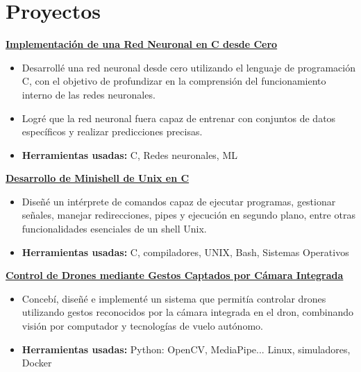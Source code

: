 \documentclass[letterpaper]{twentysecondcv} %
\begin{document}
\section{Proyectos}
\textbf{\underline{Implementación de una Red Neuronal en C desde Cero}}
{\begin{itemize}
        \item Desarrollé una red neuronal desde cero utilizando el lenguaje de programación C, con el objetivo de profundizar en la comprensión del funcionamiento interno de las redes neuronales.
        \item Logré que la red neuronal fuera capaz de entrenar con conjuntos de datos específicos y realizar predicciones precisas.
        \item \textbf{Herramientas usadas:} C, Redes neuronales, ML
\end{itemize}}
\textbf{\underline{Desarrollo de Minishell de Unix en C}}
{\begin{itemize}
        \item Diseñé un intérprete de comandos capaz de ejecutar programas, gestionar señales, manejar redirecciones, pipes y ejecución en segundo plano, entre otras funcionalidades esenciales de un shell Unix.
        \item \textbf{Herramientas usadas:} C, compiladores, UNIX, Bash, Sistemas Operativos
\end{itemize}}
\textbf{\underline{Control de Drones mediante Gestos Captados por Cámara Integrada}}
{\begin{itemize}
        \item Concebí, diseñé e implementé un sistema que permitía controlar drones utilizando gestos reconocidos por la cámara integrada en el dron, combinando visión por computador y tecnologías de vuelo autónomo.
        \item \textbf{Herramientas usadas:} Python: OpenCV, MediaPipe... Linux, simuladores, Docker
\end{itemize}}
\end{document}
